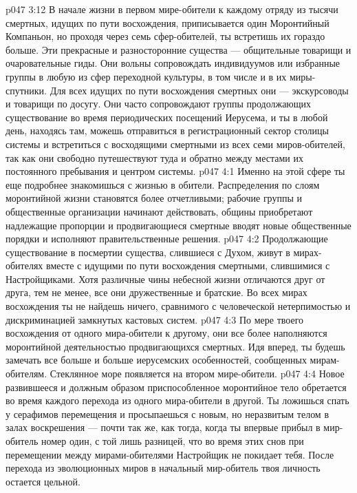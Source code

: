 \vs p047 3:12 В начале жизни в первом мире\hyp{}обители к каждому отряду из тысячи смертных, идущих по пути восхождения, приписывается один Моронтийный Компаньон, но проходя через семь сфер\hyp{}обителей, ты встретишь их гораздо больше. Эти прекрасные и разносторонние существа --- общительные товарищи и очаровательные гиды. Они вольны сопровождать индивидуумов или избранные группы в любую из сфер переходной культуры, в том числе и в их миры\hyp{}спутники. Для всех идущих по пути восхождения смертных они --- экскурсоводы и товарищи по досугу. Они часто сопровождают группы продолжающих существование во время периодических посещений Иерусема, и ты в любой день, находясь там, можешь отправиться в регистрационный сектор столицы системы и встретиться с восходящими смертными из всех семи миров\hyp{}обителей, так как они свободно путешествуют туда и обратно между местами их постоянного пребывания и центром системы.
\vs p047 4:1 Именно на этой сфере ты еще подробнее знакомишься с жизнью в обители. Распределения по слоям моронтийной жизни становятся более отчетливыми; рабочие группы и общественные организации начинают действовать, общины приобретают надлежащие пропорции и продвигающиеся смертные вводят новые общественные порядки и исполняют правительственные решения.
\vs p047 4:2 Продолжающие существование в посмертии существа, слившиеся с Духом, живут в мирах\hyp{}обителях вместе с идущими по пути восхождения смертными, слившимися с Настройщиками. Хотя различные чины небесной жизни отличаются друг от друга, тем не менее, все они дружественные и братские. Во всех мирах восхождения ты не найдешь ничего, сравнимого с человеческой нетерпимостью и дискриминацией замкнутых кастовых систем.
\vs p047 4:3 По мере твоего восхождения от одного мира\hyp{}обители к другому, они все более наполняются моронтийной деятельностью продвигающихся смертных. Идя вперед, ты будешь замечать все больше и больше иерусемских особенностей, сообщенных мирам\hyp{}обителям. Стеклянное море появляется на втором мире\hyp{}обители.
\vs p047 4:4 Новое развившееся и должным образом приспособленное моронтийное тело обретается во время каждого перехода из одного мира\hyp{}обители в другой. Ты ложишься спать у серафимов перемещения и просыпаешься с новым, но неразвитым телом в залах воскрешения --- почти так же, как тогда, когда ты впервые прибыл в мир\hyp{}обитель номер один, с той лишь разницей, что во время этих снов при перемещении между мирами\hyp{}обителями Настройщик не покидает тебя. После перехода из эволюционных миров в начальный мир\hyp{}обитель твоя личность остается цельной.
